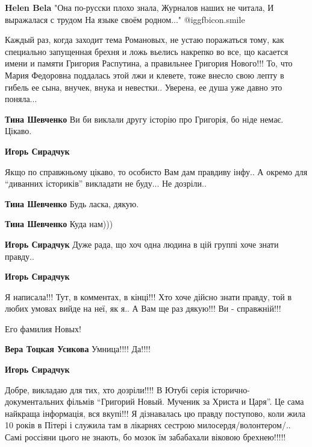 \begin{itemize}
\begin{itemize}
\textbf{Helen Bela} "Она по-русски плохо знала,
Журналов наших не читала,
И выражалася с трудом
На языке своём родном..."  @igg{fbicon.smile} 
\end{itemize} %


Каждый раз, когда заходит тема Романовых, не устаю поражаться тому, как
специально запущенная брехня и ложь вьелись накрепко во все, що касается имени
и памяти Григория Распутина, а правильнее Григория Нового!!! То, что Мария
Федоровна поддалась этой лжи и клевете, тоже внесло свою лепту в гибель ее
сына, внучек, внука и невестки.. Уверена, ее душа уже давно это поняла...

\begin{itemize} %
\textbf{Тина Шевченко} Ви би виклали другу історію про Григорія, бо ніде немає. Цікаво.

\begin{itemize} %
\textbf{Игорь Сирадчук} 

Якщо по справжньому цікаво, то особисто Вам дам правдиву інфу.. А окремо для
\enquote{диванних істориків} викладати не буду... Не дозріли..


\textbf{Тина Шевченко} Будь ласка, дякую.

\textbf{Тина Шевченко} Куда нам)))

\textbf{Игорь Сирадчук} Дуже рада, що хоч одна людина в цій группі хоче знати правду..

\textbf{Игорь Сирадчук} 

Я написала!!! Тут, в комментах, в кінці!!! Хто хоче дійсно знати правду, той в
любих умовах вийде на неї, як я.. А Вам ще раз дякую!!! Ви - справжній!!!

\end{itemize} %

Его фамилия Новых!

\textbf{Вера Тоцкая Усикова} Умница!!!! Да!!!!

\textbf{Игорь Сирадчук} 

Добре, викладаю для тих, хто дозріли!!!! В Ютубі серія історично-документальних
фільмів \enquote{Григорий Новый. Мученик за Христа и Царя}. Це сама найкраща інформація,
вся вкупі!!! Я дізнавалась цю правду поступово, коли жила 10 років в Пітері і
служила там в лікарнях сестрою милосердя/волонтером/.. Самі россіяни цього не
знають, бо мозок їм забабахали віковою брехнею!!!!!


\end{itemize}
\end{itemize}
